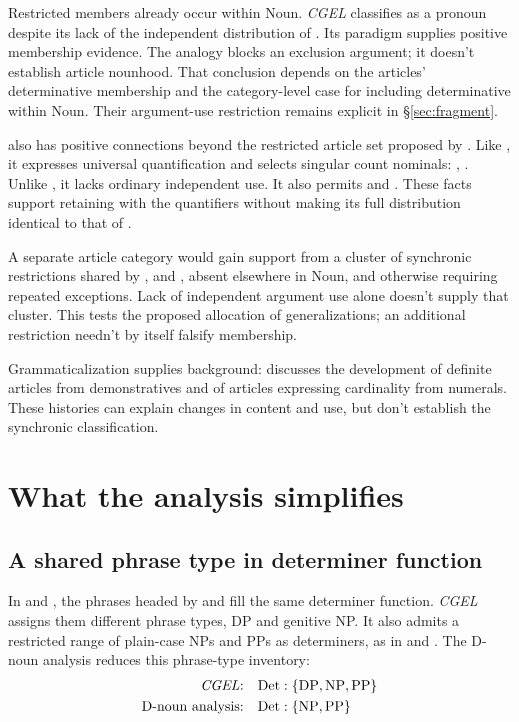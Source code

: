 \documentclass[12pt]{article}
\begin{document}
Restricted members already occur within Noun. \textit{CGEL} classifies  as a pronoun despite its lack of the independent distribution of  \citep[470--471]{huddleston2002}. Its paradigm supplies positive membership evidence. The analogy blocks an exclusion argument; it doesn't establish article nounhood. That conclusion depends on the articles' determinative membership and the category-level case for including determinative within Noun. Their argument-use restriction remains explicit in §\ref{sec:fragment}.

 also has positive connections beyond the restricted article set proposed by \textcite{spinillo2004reconceptualising}. Like , it expresses universal quantification and selects singular count nominals: , . Unlike , it lacks ordinary independent use. It also permits  and . These facts support retaining  with the quantifiers without making its full distribution identical to that of .

A separate article category would gain support from a cluster of synchronic restrictions shared by ,  and , absent elsewhere in Noun, and otherwise requiring repeated exceptions. Lack of independent argument use alone doesn't supply that cluster. This tests the proposed allocation of generalizations; an additional restriction needn't by itself falsify membership.

Grammaticalization supplies background: \textcite[331--336]{lyons1999} discusses the development of definite articles from demonstratives and of articles expressing cardinality from numerals. These histories can explain changes in content and use, but don't establish the synchronic classification.

\section{What the analysis simplifies}\label{sec:economy}

\subsection{A shared phrase type in determiner function}\label{sec:det-uniform}

In  and , the phrases headed by  and  fill the same determiner function. \textit{CGEL} assigns them different phrase types, DP and genitive NP. It also admits a restricted range of plain-case NPs and PPs as determiners, as in  and  \citep[Ch.~5, §4]{huddleston2002}. The D-noun analysis reduces this phrase-type inventory:
\[
\begin{aligned}
\text{\textit{CGEL}:} &\quad \mathrm{Det}:\{\mathrm{DP},\mathrm{NP},\mathrm{PP}\} \\
\text{D-noun analysis:} &\quad \mathrm{Det}:\{\mathrm{NP},\mathrm{PP}\}
\end{aligned}
\]
\end{document}
